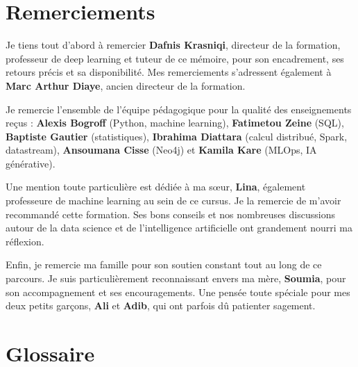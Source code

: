 \chapter*{Remerciements}


    Je tiens tout d'abord à remercier \textbf{Dafnis Krasniqi}, directeur de la formation, 
    professeur de deep learning et tuteur de ce mémoire, pour son encadrement, 
    ses retours précis et sa disponibilité. Mes remerciements s'adressent également 
    à \textbf{Marc Arthur Diaye}, ancien directeur de la formation.

    Je remercie l'ensemble de l'équipe pédagogique pour la qualité des enseignements 
    reçus : \textbf{Alexis Bogroff} (Python, machine learning), \textbf{Fatimetou Zeine} (SQL), 
    \textbf{Baptiste Gautier} (statistiques), \textbf{Ibrahima Diattara} (calcul distribué, 
    Spark, datastream), \textbf{Ansoumana Cisse} (Neo4j) et \textbf{Kamila Kare} (MLOps, IA générative).

    Une mention toute particulière est dédiée à ma sœur, \textbf{Lina}, également professeure 
    de machine learning au sein de ce cursus. Je la remercie de m'avoir recommandé 
    cette formation. Ses bons conseils et nos nombreuses discussions autour de la data 
    science et de l'intelligence artificielle ont grandement nourri ma réflexion.

    Enfin, je remercie ma famille pour son soutien constant tout au long de ce parcours.
    Je suis particulièrement reconnaissant envers ma mère, \textbf{Soumia}, pour son accompagnement et ses 
    encouragements. Une pensée toute spéciale pour mes deux petits garçons, \textbf{Ali} et \textbf{Adib}, 
    qui ont parfois dû patienter sagement.

\vspace{2cm} %

\chapter*{Glossaire}

